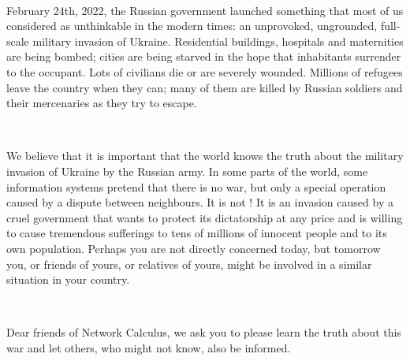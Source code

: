 ~\\
\par\indent February 24th, 2022, the Russian government launched something that most of us considered as unthinkable in the modern times: an unprovoked, ungrounded, full-scale military invasion of Ukraine. Residential buildings, hospitals and maternities are being bombed; cities are being starved in the hope that inhabitants surrender to the occupant. Lots of civilians die or are severely wounded. Millions of refugees leave the country when they can; many of them are killed by Russian soldiers and their mercenaries as they try to escape.

~\\
\par\indent We believe that it is important that the world knows the truth about the military invasion of Ukraine by the Russian army. In some parts of the world, some information systems pretend that there is no war, but only a special operation caused by a dispute between neighbours. It is not ! It is an invasion caused by a cruel government that wants to protect its dictatorship at any price and is willing to cause tremendous sufferings to tens of millions of innocent people and to its own population. Perhaps you are not directly concerned today, but tomorrow you, or friends of yours, or relatives of yours, might be involved in a similar situation in your country.

~\\
\par\indent Dear friends of Network Calculus, we ask you to please learn the truth about this war and let others, who might not know, also be informed.
~\\